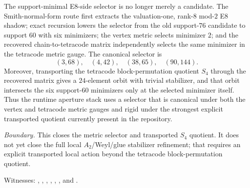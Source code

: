 %

\begin{result}
The support-minimal E8-side selector is no longer merely a candidate.  The Smith-normal-form route first
extracts the valuation-one, rank-$8$ mod-$2$ E8 shadow; exact recursion lowers the selector from the old
support-$76$ candidate to support $60$ with six minimizers; the vertex metric selects minimizer $2$; and
the recovered chain-to-tetracode matrix independently selects the same minimizer in the tetracode metric
gauge.  The canonical selector is
\[
  (3,68),\quad (4,42),\quad (38,65),\quad (90,144).
\]
Moreover, transporting the tetracode block-permutation quotient $S_4$ through the recovered matrix gives
a $24$-element orbit with trivial stabilizer, and that orbit intersects the six support-$60$ minimizers
only at the selected minimizer itself.  Thus the runtime aperture stack uses a selector that is canonical
under both the vertex and tetracode metric gauges and rigid under the strongest explicit transported
quotient currently present in the repository.

\emph{Boundary.}  This closes the metric selector and transported $S_4$ quotient.  It does not yet close
the full local $A_2$/Weyl/glue stabilizer refinement; that requires an explicit transported local action
beyond the tetracode block-permutation quotient.

Witnesses: ,
,
,
,
,
, and
.
\end{result}
